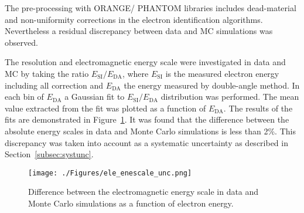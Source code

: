 The pre-processing with ORANGE/ PHANTOM libraries includes dead-material and non-uniformity corrections in the electron identification algorithms. Nevertheless a residual discrepancy between data and MC simulations was observed. 

The resolution and electromagnetic energy scale were investigated in data and MC by taking the ratio $E_\text{SI}/E_\text{DA}$, where $E_\text{SI}$ is the measured electron energy including all correction and $E_\text{DA}$ the energy measured by double-angle method. In each bin of $E_\text{DA}$ a Gaussian fit to $E_\text{SI}/E_\text{DA}$ distribution was performed. The mean value extracted from the fit was plotted as a function of $E_\text{DA}$. The results of the fits are demonstrated in Figure~\ref{fig:ele_enescale_unc}. It was found that the difference between the absolute energy scales in data and Monte Carlo simulations is less than 2\%. This discrepancy was taken into account as a systematic uncertainty as described in Section~\ref{subsec:systunc}.
\begin{figure}
	\centering
		\texttt{[image: ./Figures/ele\_enescale\_unc.png]}
	\caption{Difference between the electromagnetic energy scale in data and Monte Carlo simulations as a function of electron energy.}
	\label{fig:ele_enescale_unc}
\end{figure}
